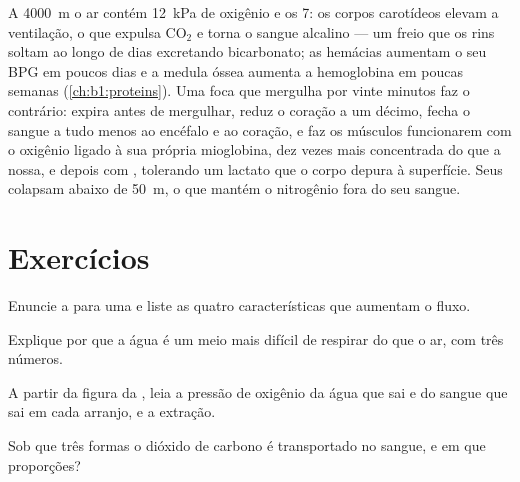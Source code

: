 \begin{example}\label{ex:b1:gas-exchange:altitudediving}
A \qty{4000}{m} o ar contém \qty{12}{kPa} de oxigênio e os 
\qty{7}{}: os corpos carotídeos elevam a ventilação, o que expulsa
$\mathrm{CO_2}$ e torna o sangue alcalino --- um freio que os rins
soltam ao longo de dias excretando bicarbonato; as hemácias aumentam
o seu BPG em poucos dias e a medula óssea aumenta a hemoglobina em
poucas semanas (\cref{ch:b1:proteins}). Uma foca que mergulha por
vinte minutos faz o contrário: expira antes de mergulhar, reduz o
coração a um décimo, fecha o sangue a tudo menos ao encéfalo e ao
coração, e faz os músculos funcionarem com o oxigênio ligado à sua
própria mioglobina, dez vezes mais concentrada do que a nossa, e
depois com , tolerando um lactato que o corpo depura à
superfície. Seus  colapsam abaixo de \qty{50}{m}, o que mantém
o nitrogênio fora do seu sangue.
\end{example}

\section{Exercícios}

\begin{exercise}[$\star$]\label{exo:b1:gas-exchange:1}
Enuncie a  para uma  e liste as quatro
características que aumentam o fluxo.
\end{exercise}

\begin{exercise}[$\star$]\label{exo:b1:gas-exchange:2}
Explique por que a água é um meio mais difícil de respirar do que o
ar, com três números.
\end{exercise}

\begin{exercise}[$\star$]\label{exo:b1:gas-exchange:3}
A partir da figura da , leia a pressão de oxigênio da
água que sai e do sangue que sai em cada arranjo, e a extração.
\end{exercise}

\begin{exercise}[$\star$]\label{exo:b1:gas-exchange:4}
Sob que três formas o dióxido de carbono é transportado no sangue, e
em que proporções?
\end{exercise}

